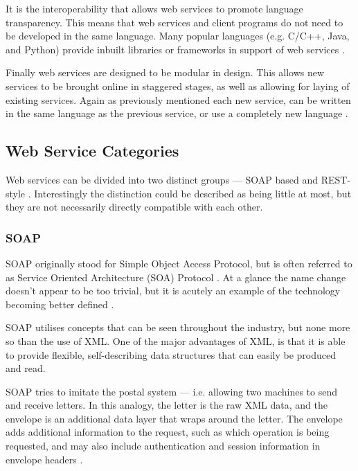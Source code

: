 It is the interoperability that allows web services to promote language 
transparency. This means that web services and client programs do not need to 
be developed in the same language. Many popular languages (e.g. C/C++, Java, and
Python) provide inbuilt libraries or frameworks in support of web services 
\citep{kalin13}.

Finally web services are designed to be modular in design. This allows new 
services to be brought online in staggered stages, as well as allowing for 
laying of existing services. Again as previously mentioned each new service, 
can be written in the same language as the previous service, or use a completely 
new language \citep{kalin13}. 


\subsection{Web Service Categories}

Web services can be divided into two distinct groups --- SOAP based and 
REST-style \citep{kalin13}. Interestingly the distinction could be described 
as being little at most, but they are not necessarily directly compatible with 
each other. 


\subsubsection{SOAP}

SOAP originally stood for Simple Object Access Protocol, but is often referred 
to as Service Oriented Architecture (SOA) Protocol \citep{kalin13}. At a glance
the name change doesn't appear to be too trivial, but it is acutely an example 
of the technology becoming better defined \citep{kalin13}.

SOAP utilises concepts that can be seen throughout the industry, but none more 
so than the use of XML. One of the major advantages of XML, is that it is able 
to provide flexible, self-describing data structures that can easily be 
produced and read.

SOAP tries to imitate the postal system --- i.e. allowing two machines to send 
and receive letters. In this analogy, the letter is the raw XML data, and the 
envelope is an additional data layer that wraps around the letter. The envelope
adds additional information to the request, such as which operation is being 
requested, and may also include authentication and session information in 
envelope headers \citep{gershon04}.

